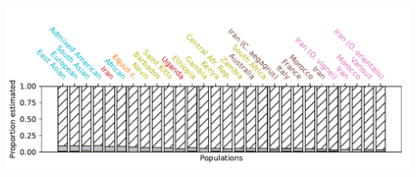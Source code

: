 \documentclass{article}
\begin{document}
    \begin{center}
        \begin{minipage}{0.75\linewidth}
            \begin{minipage}{0.9\linewidth}
                \includegraphics[width=\linewidth, page=1]{artworks/Theta.neg.stacked.pdf}
            \end{minipage}
            \begin{minipage}{0.09\linewidth}

\end{minipage}
\end{minipage}
\end{center}
\end{document}
